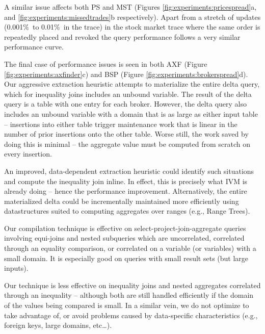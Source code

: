A similar issue affects both PS and MST (Figures \ref{fig:experiments:pricespread}a, and \ref{fig:experiments:missedtrades}b respectively).  Apart from a stretch of updates (0.001\%\ to 0.01\%\ in the trace) in the stock market trace where the same order is repeatedly placed and revoked the query performance follows a very similar performance curve. 

The final case of performance issues is seen in both AXF (Figure \ref{fig:experiments:axfinder}c) and BSP (Figure \ref{fig:experiments:brokerspread}d).  Our aggressive extraction heuristic attempts to materialize the entire delta query, which for inequality joins includes an unbound variable.  The result of the delta query is a table with one entry for each broker.  However, the delta query also includes an unbound variable with a domain that is as large as either input table -- insertions into either table trigger maintenance work that is linear in the number of prior insertions onto the other table.  Worse still, the work saved by doing this is minimal -- the aggregate value must be computed from scratch on every insertion.

An improved, data-dependent extraction heuristic could identify such situations and compute the inequality join inline.  In effect, this is precisely what IVM is already doing -- hence the performance improvement.  Alternatively, the entire materialized delta could be incrementally maintained more efficiently using datastructures suited to computing aggregates over ranges (e.g., Range Trees\cite{range trees}).


Our compilation technique is effective on select-project-join-aggregate queries involving equi-joins and nested subqueries which are uncorrelated, correlated through an equality comparison, or correlated on a variable (or variables) with a small domain.  It is especially good on queries with small result sets (but large inputs).

Our technique is less effective on inequality joins and nested aggregates correlated through an inequality -- although both are still handled efficiently if the domain of the values being compared is small.  In a similar vein, we do not optimize to take advantage of, or avoid problems caused by data-specific characteristics (e.g., foreign keys, large domains, etc\ldots). 


